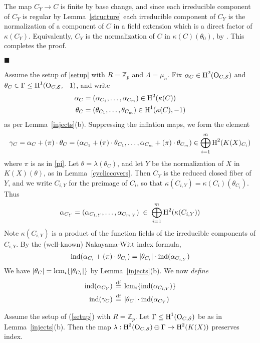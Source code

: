 \documentclass{amsart}
\theoremstyle{plain}
\theoremstyle{definition}
\theoremstyle{remark}
\numberwithin{equation}{section}%
\renewcommand{\H}{{\text{\rm H}}}
\renewcommand{\O}{{\text{\rm O}}}
\renewcommand{\S}{{\mathcal S}}
\newcommand{\Z}{{\mathbb Z}}
\newcommand{\df}{{\,\overset{\text{\rm df}}{=}\,}}
\newcommand{\ind}{{\text{\rm ind}}}
\newcommand{\lcm}{{\text{\rm lcm}}}
\begin{document}
The map $C_Y\to C$ is finite by base change,
and since each irreducible component of $C_Y$ is regular by Lemma~\ref{structure} 
each irreducible component of $C_Y$ is the normalization of a component of $C$ in 
a field extension which is a direct factor of $\kappa(C_Y)$.
Equivalently, $C_Y$ is the normalization of $C$ in $\kappa(C)(\theta_0)$, by \cite[6.3.7]{EGAII}.
This completes the proof.

\hfill $\blacksquare$

\label{index}
Assume the setup of \eqref{setup} with $R=\Z_p$ and $\Lambda=\mu_n$.
Fix $\alpha_C\in\H^2(\O_{C,\S})$ and $\theta_C\in \Gamma\leq\H^1(\O_{C,\S},-1)$, 
and write
\begin{align*}
\alpha_C&=(\alpha_{C_1},\dots,\alpha_{C_m})\in\H^2(\kappa(C))\\
\theta_C&=(\theta_{C_1},\dots,\theta_{C_m})\in\H^1(\kappa(C),-1)
\end{align*}
as per Lemma~\ref{injects}(b).
Suppressing the inflation maps, we form the element
$$
\gamma_C=
\alpha_C+(\pi)\cdot\theta_C=(\alpha_{C_1}+(\pi)\cdot\theta_{C_1},
\dots,\alpha_{C_m}+(\pi)\cdot\theta_{C_m})
\in\bigoplus_{i=1}^m\H^2(K(X)_{C_i})
$$
where $\pi$ is as in \eqref{pi}.
Let $\theta=\lambda(\theta_C)$, and let $Y$ be the normalization of $X$ in $K(X)(\theta)$,
as in Lemma~\ref{cycliccovers}.
Then $C_Y$ is the reduced closed fiber of $Y$, and we write $C_{i,Y}$ for the preimage of $C_i$,
so that $\kappa(C_{i,Y})=\kappa(C_i)(\theta_{C_i})$.
Thus
$$
\alpha_{C_Y}=(\alpha_{C_{1,Y}},\dots,\alpha_{C_{m,Y}})
\;\in\;\bigoplus_{i=1}^m\H^2(\kappa(C_{i,Y}))
$$
Note $\kappa(C_{i,Y})$ is a product of the function fields of the irreducible components of $C_{i,Y}$.
By the (well-known) Nakayama-Witt index formula,
$$
\ind(\alpha_{C_i}+(\pi)\cdot\theta_{C_i})=|\theta_{C_i}|\cdot\ind(\alpha_{C_{i,Y}})
$$
We have $|\theta_C|=\lcm_i\{|\theta_{C_i}|\}$ by Lemma~\ref{injects}(b). 
We now {\it define}
\begin{align*}
\ind(\alpha_{C_Y})\;&\df\;\lcm_i\{\ind(\alpha_{C_{i,Y}})\}\\
\ind(\gamma_C)\;&\df\;|\theta_C|\cdot\ind(\alpha_{C_Y})
\end{align*}

\Theorem\label{preservesindex}
Assume the setup of (\ref{setup}) with $R=\Z_p$.
Let $\Gamma\leq\H^1(\O_{C,\S})$ be as in Lemma~\ref{injects}(b).
Then the map $\lambda:\H^2(\O_{C,\S})\oplus \Gamma\to\H^2(K(X))$
preserves index.
\rm
\end{document}

